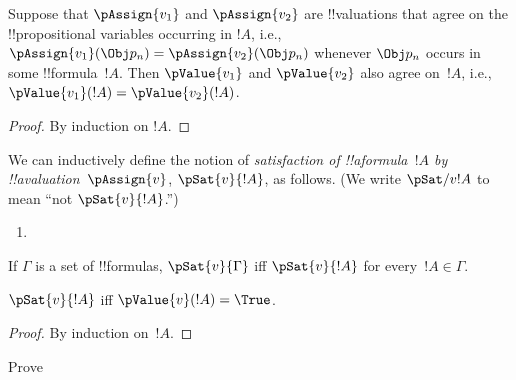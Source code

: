 \begin{thm}
 Suppose that $\pAssign{v_1}$ and
$\pAssign{v_2}$ are !!{valuation}s that agree on the !!{propositional
variable}s occurring in $!A$, i.e., $\pAssign{v_1}(\Obj p_n) =
\pAssign{v_2}(\Obj p_n)$ whenever $\Obj p_n$ occurs in some
!!{formula}~$!A$. Then $\pValue{v_1}$ and $\pValue{v_2}$ also agree
on~$!A$, i.e., $\pValue{v_1}(!A) = \pValue{v_2}(!A)$.
\end{thm}

\begin{proof}
By induction on $!A$.
\end{proof}

\begin{defn}[Satisfaction]
 We can inductively define the notion of
  \emph{satisfaction of !!a{formula}~$!A$ by
  !!a{valuation}~$\pAssign{v}$}, $\pSat{v}{!A}$, as follows.
  (We write $\pSat/{v}{!A}$ to mean ``not $\pSat{v}{!A}$.'')
\begin{enumerate}




\item {}










\end{enumerate}
If $\Gamma$ is a set of !!{formula}s, $\pSat{v}{\Gamma}$ iff
$\pSat{v}{!A}$ for every~$!A \in \Gamma$.
\end{defn}

\begin{prop}
  $\pSat{v}{!A}$ iff $\pValue{v}(!A) = \True$.
\end{prop}

\begin{proof}
  By induction on~$!A$.
\end{proof}

\begin{prob}
  Prove 
\end{prob}






